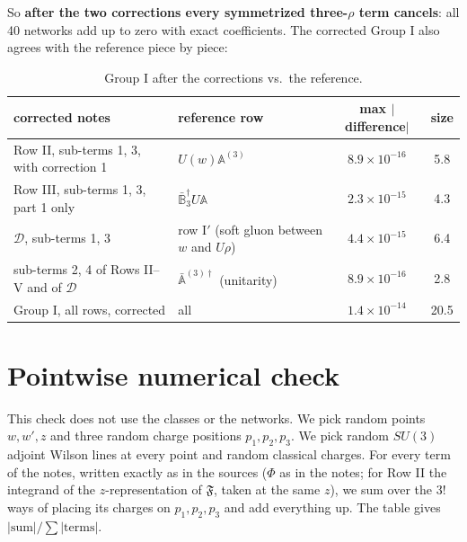 \documentclass[10pt]{article}
\numberwithin{equation}{section}
\begin{document}
\medskip
So \textbf{after the two corrections every symmetrized three-$\rho$ term cancels}: all 40 networks add up to zero with exact coefficients. The corrected Group I also agrees with the reference piece by piece:

\begin{table}[h]
\centering\small
\begin{tabular}{@{}l l c c@{}}
corrected notes & reference row & max $|$difference$|$ & size\\ \hline
Row II, sub-terms 1, 3, with correction 1 & $U(w)\mathbb A^{(3)}$ & $8.9\times10^{-16}$ & 5.8\\
Row III, sub-terms 1, 3, part 1 only & $\bar{\mathbb B}_3^\dagger U\mathbb A$ & $2.3\times10^{-15}$ & 4.3\\
$\mathcal D$, sub-terms 1, 3 & row I$'$ (soft gluon between $w$ and $U\rho$) & $4.4\times10^{-15}$ & 6.4\\
sub-terms 2, 4 of Rows II--V and of $\mathcal D$ & $\bar{\mathbb A}^{(3)\dagger}$ (unitarity) & $8.9\times10^{-16}$ & 2.8\\
Group I, all rows, corrected & all & $1.4\times10^{-14}$ & 20.5\\
\end{tabular}
\caption{Group I after the corrections vs.\ the reference.}
\label{tab:after}
\end{table}

\section{Pointwise numerical check}\label{sec:pointwise}

This check does not use the classes or the networks. We pick random points $w,w',z$ and three random charge positions $p_1,p_2,p_3$. We pick random $SU(3)$ adjoint Wilson lines at every point and random classical charges. For every term of the notes, written exactly as in the sources ($\Phi$ as in the notes; for Row II the integrand of the $z$-representation of $\mathfrak F$, taken at the same $z$), we sum over the $3!$ ways of placing its charges on $p_1,p_2,p_3$ and add everything up. The table gives $|\text{sum}|/\sum|\text{terms}|$.
\end{document}
